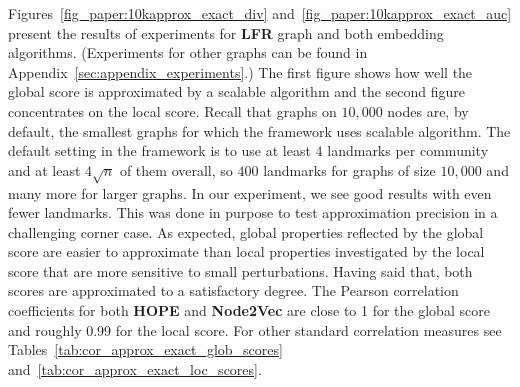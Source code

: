 \documentclass[11pt]{article}
\begin{document}
Figures~\ref{fig_paper:10kapprox_exact_div} and~\ref{fig_paper:10kapprox_exact_auc} present the results of experiments for \textbf{LFR} graph and both embedding algorithms. (Experiments for other graphs can be found in Appendix~\ref{sec:appendix_experiments}.) The first figure shows how well the global score is approximated by a scalable algorithm and the second figure concentrates on the local score. Recall that graphs on $10{,}000$ nodes are, by default, the smallest graphs for which the framework uses scalable algorithm. The default setting in the framework is to use at least $4$ landmarks per community and at least $4\sqrt{n}$ of them overall, so $400$ landmarks for graphs of size $10{,}000$ and many more for larger graphs. In our experiment, we see good results with even fewer landmarks. This was done in purpose to test approximation precision in a challenging corner case. As expected, global properties reflected by the global score are easier to approximate than local properties investigated by the local score that are more sensitive to small perturbations. Having said that, both scores are approximated to a satisfactory degree. The Pearson correlation coefficients for both \textbf{HOPE} and \textbf{Node2Vec} are close to 1 for the global score and roughly 0.99 for the local score. For other standard correlation measures see Tables~\ref{tab:cor_approx_exact_glob_scores} and~\ref{tab:cor_approx_exact_loc_scores}.

\begin{table}[htb]
\centering
{}
     \caption{Correlation between approximated and (exact) global scores.}
     \label{tab:cor_approx_exact_glob_scores}
 \end{table}
\end{document}
